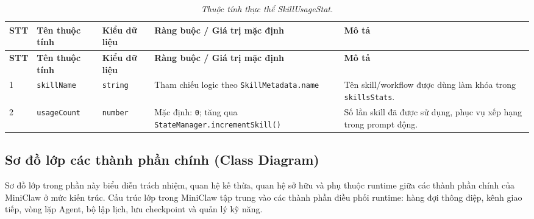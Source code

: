 \begin{longtable}{|p{0.55cm}|p{2.55cm}|p{2.7cm}|p{3.25cm}|p{4.0cm}|}
\caption{\emph{Thuộc tính thực thể SkillUsageStat.}}\label{tab:erd-skill-usage-stat}\\
\hline
\textbf{STT} & \textbf{Tên thuộc tính} & \textbf{Kiểu dữ liệu} & \textbf{Ràng buộc / Giá trị mặc định} & \textbf{Mô tả} \\
\hline
\endfirsthead
\hline
\textbf{STT} & \textbf{Tên thuộc tính} & \textbf{Kiểu dữ liệu} & \textbf{Ràng buộc / Giá trị mặc định} & \textbf{Mô tả} \\
\hline
\endhead
1 & \texttt{skillName} & \texttt{string} & Tham chiếu logic theo \texttt{SkillMetadata.name} & Tên skill/workflow được dùng làm khóa trong \texttt{skillsStats}. \\
\hline
2 & \texttt{usageCount} & \texttt{number} & Mặc định: \texttt{0}; tăng qua \texttt{StateManager.}\newline\texttt{incrementSkill()} & Số lần skill đã được sử dụng, phục vụ xếp hạng trong prompt động. \\
\hline
\end{longtable}

\endgroup

\subsection{Sơ đồ lớp các thành phần chính (Class Diagram)}
Sơ đồ lớp trong phần này biểu diễn trách nhiệm, quan hệ kế thừa, quan hệ sở hữu và phụ thuộc runtime giữa các thành phần chính của MiniClaw ở mức kiến trúc.
Cấu trúc lớp trong MiniClaw tập trung vào các thành phần điều phối runtime: hàng đợi thông điệp, kênh giao tiếp, vòng lặp Agent, bộ lập lịch, lưu checkpoint và quản lý kỹ năng.


